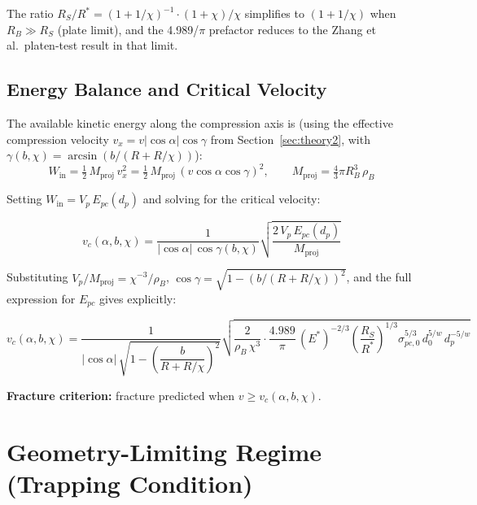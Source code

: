 \documentclass{article}
\begin{document}
The ratio $R_S/R^* = (1 + 1/\chi)^{-1}\cdot(1 + \chi)/\chi$ simplifies to
$(1+1/\chi)$ when $R_B \gg R_S$ (plate limit), and the 4.989/$\pi$ prefactor
reduces to the Zhang et al.\ platen-test result in that limit.

\subsection{Energy Balance and Critical Velocity}

The available kinetic energy along the compression axis is (using the effective
compression velocity $v_x = v|\cos\alpha|\cos\gamma$ from Section~\ref{sec:theory2},
with $\gamma(b,\chi) = \arcsin\!\left(b/(R+R/\chi)\right)$):
\begin{equation}
    W_{\text{in}} = \tfrac{1}{2}\,M_{\text{proj}}\,v_x^2
                  = \tfrac{1}{2}\,M_{\text{proj}}\,(v\cos\alpha\cos\gamma)^2,
    \qquad M_{\text{proj}} = \tfrac{4}{3}\pi R_B^3\,\rho_B
\end{equation}

Setting $W_{\text{in}} = V_p\,E_{pc}(d_p)$ and solving for the critical velocity:

\begin{equation}
\boxed{
    v_c(\alpha,b,\chi) = \frac{1}{|\cos\alpha|\,\cos\gamma(b,\chi)}
                  \sqrt{\frac{2\,V_p\,E_{pc}(d_p)}{M_{\text{proj}}}}
}
\end{equation}

Substituting $V_p/M_{\text{proj}} = \chi^{-3}/\rho_B$, $\cos\gamma = \sqrt{1-(b/(R+R/\chi))^2}$,
and the full expression for $E_{pc}$ gives explicitly:

\begin{equation}
    v_c(\alpha,b,\chi) = \frac{1}{|\cos\alpha|\,\sqrt{1-\left(\dfrac{b}{R+R/\chi}\right)^{\!2}}}
    \sqrt{
        \frac{2}{\rho_B\,\chi^3}
        \cdot
        \frac{4.989}{\pi}
        \,(E^*)^{-2/3}
        \left(\frac{R_S}{R^*}\right)^{\!1/3}
        \sigma_{pc,0}^{5/3}\,d_0^{5/w}\,d_p^{-5/w}
    }
\end{equation}

\noindent\textbf{Fracture criterion:} fracture predicted when $v \geq v_c(\alpha,b,\chi)$.

\section{Geometry-Limiting Regime (Trapping Condition)}
\label{sec:geometry}
\end{document}
